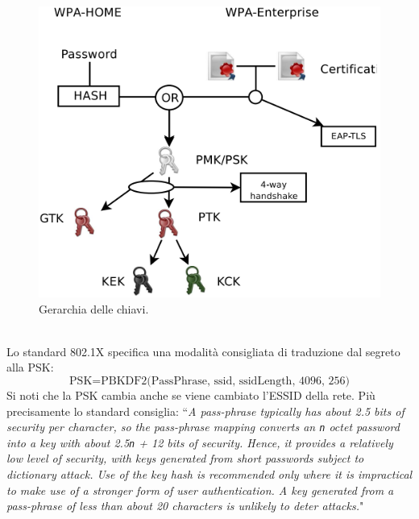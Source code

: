 \begin{figure}[htbp]
	\centering
	\includegraphics[scale = 0.23]{images/key-hierarchy}
	\caption{Gerarchia delle chiavi.}
	\label{img:key-hierarchy}
\end{figure}\\
Lo standard 802.1X specifica una modalità consigliata di traduzione dal segreto alla PSK:
$$\text{PSK} = \text{PBKDF2(PassPhrase, ssid, ssidLength, 4096, 256)}$$
Si noti che la PSK cambia anche se viene cambiato l'ESSID della rete. Più precisamente lo standard consiglia: \textquotedblleft \textit{A pass-phrase typically has about 2.5 bits of security per character, so the pass-phrase mapping converts an \texttt{n} octet password into a key with about 2.5\texttt{n} + 12 bits of security. Hence, it provides a relatively low level of security, with keys generated from short passwords subject to dictionary attack. Use of the key hash is recommended only where it is impractical to make use of a stronger form of user authentication. A key generated from a pass-phrase of less than about 20 characters is unlikely to deter attacks.}"
